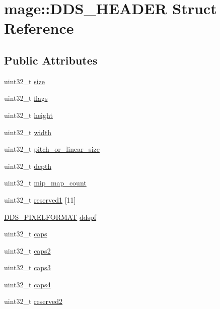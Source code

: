 \hypertarget{structmage_1_1_d_d_s___h_e_a_d_e_r}{}\section{mage\+:\+:D\+D\+S\+\_\+\+H\+E\+A\+D\+ER Struct Reference}
\label{structmage_1_1_d_d_s___h_e_a_d_e_r}
\subsection*{Public Attributes}
\begin{DoxyCompactItemize}
\item 
uint32\+\_\+t \hyperlink{structmage_1_1_d_d_s___h_e_a_d_e_r_a6482c2116e359d2192e7e9f9b9bade94}{size}
\item 
uint32\+\_\+t \hyperlink{structmage_1_1_d_d_s___h_e_a_d_e_r_a9058659a1eba7d049f5addd09791439e}{flags}
\item 
uint32\+\_\+t \hyperlink{structmage_1_1_d_d_s___h_e_a_d_e_r_add2352edab3631c2d78ff1ec5d027fbc}{height}
\item 
uint32\+\_\+t \hyperlink{structmage_1_1_d_d_s___h_e_a_d_e_r_af85eb50a0cb1ba682ebd47fd8f009156}{width}
\item 
uint32\+\_\+t \hyperlink{structmage_1_1_d_d_s___h_e_a_d_e_r_aa2c802d3f03b1d9838841a8f6d2c71d0}{pitch\+\_\+or\+\_\+linear\+\_\+size}
\item 
uint32\+\_\+t \hyperlink{structmage_1_1_d_d_s___h_e_a_d_e_r_a7852a4695a8f8a2eb6b6fe5b3d9397ba}{depth}
\item 
uint32\+\_\+t \hyperlink{structmage_1_1_d_d_s___h_e_a_d_e_r_aab57cee5b4f63301d2ef702c49c3d191}{mip\+\_\+map\+\_\+count}
\item 
uint32\+\_\+t \hyperlink{structmage_1_1_d_d_s___h_e_a_d_e_r_a3bc3b3970db4747f8911aeb93fe6e309}{reserved1} \mbox{[}11\mbox{]}
\item 
\hyperlink{structmage_1_1_d_d_s___p_i_x_e_l_f_o_r_m_a_t}{D\+D\+S\+\_\+\+P\+I\+X\+E\+L\+F\+O\+R\+M\+AT} \hyperlink{structmage_1_1_d_d_s___h_e_a_d_e_r_af7a75b761a23052acab158294208b5d8}{ddspf}
\item 
uint32\+\_\+t \hyperlink{structmage_1_1_d_d_s___h_e_a_d_e_r_ad44c3f88942707c377f25a64fb1b6872}{caps}
\item 
uint32\+\_\+t \hyperlink{structmage_1_1_d_d_s___h_e_a_d_e_r_ada2de9e6468e8d5da2a3e246bc079dc9}{caps2}
\item 
uint32\+\_\+t \hyperlink{structmage_1_1_d_d_s___h_e_a_d_e_r_a85726c8826cc856565e2c978cb37ff4b}{caps3}
\item 
uint32\+\_\+t \hyperlink{structmage_1_1_d_d_s___h_e_a_d_e_r_a9f36aa53c86e3aa2bd7c667f28460645}{caps4}
\item 
uint32\+\_\+t \hyperlink{structmage_1_1_d_d_s___h_e_a_d_e_r_abb51770a073353c831a802fda3f72d5c}{reserved2}
\end{DoxyCompactItemize}


